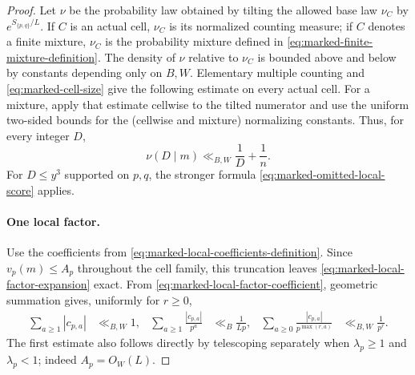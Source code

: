 \documentclass[11pt]{article}
\numberwithin{equation}{section}
\theoremstyle{definition}
\theoremstyle{remark}
\newcommand{\1}{\mathbf 1}
\begin{document}
\begin{proof}
Let \(\nu\) be the probability law obtained by tilting the allowed base
law \(\nu_C\) by \(e^{S_{\{p,q\}}/L}\).  If \(C\) is an actual cell,
\(\nu_C\) is its normalized counting measure; if \(C\) denotes a finite
mixture, \(\nu_C\) is the probability mixture defined in
\eqref{eq:marked-finite-mixture-definition}.  The density of \(\nu\)
relative to \(\nu_C\) is bounded above and below by constants depending
only on \(B,W\).  Elementary multiple counting and
\eqref{eq:marked-cell-size} give the following estimate on every actual
cell.  For a mixture, apply that estimate cellwise to the tilted
numerator and use the uniform two-sided bounds for the (cellwise and
mixture) normalizing constants.  Thus, for every integer \(D\),
\begin{equation}
                  \nu(D\mid m)\ll_{B,W}\frac1D+\frac1n.
 \label{eq:marked-omitted-elementary-bound}
\end{equation}
For \(D\le y^3\) supported on \(p,q\), the stronger formula
\eqref{eq:marked-omitted-local-score} applies.

\paragraph{One local factor.}
Use the coefficients from
\eqref{eq:marked-local-coefficients-definition}.  Since
\(v_p(m)\le A_p\) throughout
the cell family, this truncation leaves
\eqref{eq:marked-local-factor-expansion} exact.  From
\eqref{eq:marked-local-factor-coefficient}, geometric summation gives,
uniformly for \(r\ge0\),
\begin{align}
 \sum_{a\ge1}|c_{p,a}|&\ll_{B,W}1,
 &\sum_{a\ge1}\frac{|c_{p,a}|}{p^a}&\ll_B\frac1{Lp},
 &\sum_{a\ge0}\frac{|c_{p,a}|}{p^{\max(r,a)}}
      &\ll_{B,W}\frac1{p^r}.
 \label{eq:marked-local-coefficient-sums}
\end{align}
The first estimate also follows directly by telescoping separately when
\(\lambda_p\ge1\) and \(\lambda_p<1\); indeed \(A_p=O_W(L)\).


\end{proof}
\end{document}
